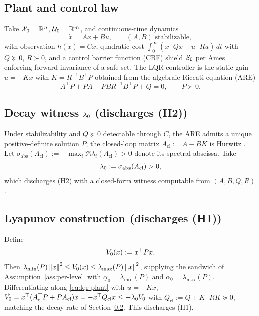 \documentclass[11pt,a4paper]{article}
\begin{document}
\subsection{Plant and control law}
\label{sec:app-lqr-plant}
Take $\mathcal{X}_0 = \mathbb{R}^n$, $\mathcal{U}_0 = \mathbb{R}^m$, and continuous-time dynamics
\begin{equation}
  \dot{x} = A x + B u, \qquad (A, B) \text{ stabilizable},
  \label{eq:lqr-plant}
\end{equation}
with observation $h(x) = C x$, quadratic cost $\int_0^\infty
(x^\top Q x + u^\top R u)\,dt$ with $Q \succeq 0$, $R \succ 0$, and a
control barrier function (CBF) shield $S_0$ per
Ames~\cite{ames2019cbf} enforcing forward invariance of a safe set.
The LQR controller is the static gain $u = -K x$ with
$K = R^{-1} B^\top P$ obtained from the algebraic Riccati equation
(ARE)
\begin{equation}
  A^\top P + P A - P B R^{-1} B^\top P + Q = 0,
  \qquad P \succ 0.
  \label{eq:lqr-are}
\end{equation}

\subsection{Decay witness $\lambda_0$ (discharges (H2))}
\label{sec:app-lqr-decay}
Under stabilizability and $Q \succeq 0$ detectable through $C$, the
ARE admits a unique positive-definite solution $P$; the closed-loop
matrix $A_{\text{cl}} := A - B K$ is Hurwitz
\cite{khalil2002nonlinear}.  Let $\sigma_{\text{abs}}(A_{\text{cl}})
:= -\max_i \Re \lambda_i(A_{\text{cl}}) > 0$ denote its spectral
abscissa.  Take
\begin{equation}
  \lambda_0 := \sigma_{\text{abs}}(A_{\text{cl}}) > 0,
\end{equation}
which discharges (H2) with a closed-form witness computable from
$(A, B, Q, R)$.

\subsection{Lyapunov construction (discharges (H1))}
\label{sec:app-lqr-lyap}
Define
\begin{equation}
  V_{0}(x) := x^\top P x.
\end{equation}
Then $\lambda_{\min}(P) \left\| x \right\|^2 \leq V_{0}(x) \leq
\lambda_{\max}(P) \left\| x \right\|^2$, supplying the sandwich of
Assumption~\ref{ass:per-level} with
$\underline{\alpha}_0 = \lambda_{\min}(P)$ and
$\bar{\alpha}_0 = \lambda_{\max}(P)$.  Differentiating along
\eqref{eq:lqr-plant} with $u = -K x$,
$\dot{V_{0}} = x^\top (A_{\text{cl}}^\top P + P A_{\text{cl}}) x
= -x^\top Q_{\text{cl}} x \leq -\lambda_0 V_{0}$ with
$Q_{\text{cl}} := Q + K^\top R K \succeq 0$, matching the decay rate
of Section~\ref{sec:app-lqr-decay}.  This discharges (H1).
\end{document}
